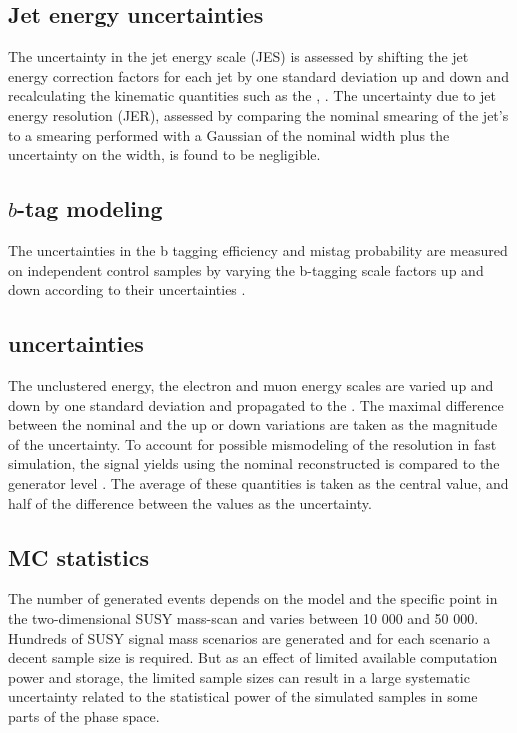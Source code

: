 \subsection*{Jet energy uncertainties}
\noindent\justify
The uncertainty in the jet energy scale (JES) is assessed by shifting the jet energy correction factors for each jet by one standard deviation up and down and recalculating the kinematic quantities such as the \ptmiss, \mttwo. 
The uncertainty due to jet energy resolution (JER), assessed by comparing the nominal smearing of the jet's \pt to a smearing performed with a Gaussian of the nominal width plus the uncertainty on the width, is found to be negligible.  
\subsection*{$b$-tag modeling} 
\noindent\justify
The uncertainties in the b tagging efficiency and mistag probability are measured on independent control samples by varying the b-tagging scale factors up and down according to their uncertainties \cite{Sirunyan:2017ezt}. 
\subsection*{\ptmiss uncertainties} 
\noindent\justify
The unclustered energy, the electron and muon energy scales are varied up and down by one standard deviation and propagated to the \ptmiss. 
The maximal difference between the nominal \ptmiss and the up or down variations are taken as the magnitude of the uncertainty. 
To account for possible mismodeling of the \ptmiss resolution in fast simulation, the signal yields using the nominal reconstructed \ptmiss is compared to the generator level \ptmiss. 
The average of these \ptmiss quantities is taken as the central value, and half of the difference between the values as the uncertainty. 
\subsection*{MC statistics} 
\noindent\justify
The number of generated events depends on the model and the specific point in the two-dimensional SUSY mass-scan and varies between 10 000 and 50 000.
Hundreds of SUSY signal mass scenarios are generated and for each scenario a decent sample size is required. 
But as an effect of limited available computation power and storage, the limited sample sizes can result in a large systematic uncertainty related to the statistical power of the simulated samples in some parts of the phase space. 
